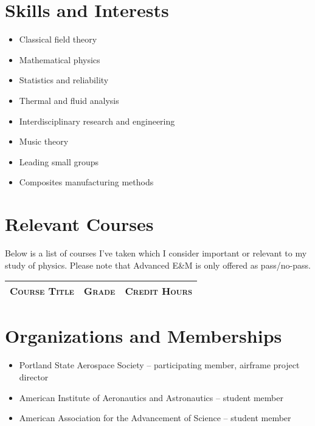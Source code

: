 \documentclass[letterpaper]{article}
\begin{document}
\section{Skills and Interests}
\begin{minipage}{\textwidth}
\begin{center}
\begin{multicols}{2}
\begin{itemize}
	\item Classical field theory
	\item Mathematical physics
	\item Statistics and reliability
	\item Thermal and fluid analysis
	\item Interdisciplinary research and engineering
	\item Music theory
	\item Leading small groups
	\item Composites manufacturing methods
\end{itemize}
\end{multicols}
\end{center}
\end{minipage}


\section{Relevant Courses}
\noindent Below is a list of courses I've taken which I consider important or relevant to my study of physics.
Please note that Advanced E\&M is only offered as pass/no-pass.
\begin{center}
\begin{tabular}{llr}
\textsc{Course Title}	&	\textsc{Grade}	&	\textsc{Credit Hours}	\\
	\hline

\end{tabular}
\end{center}


\section{Organizations and Memberships}
\begin{itemize}
	\item Portland State Aerospace Society -- participating member, airframe project director
	\item American Institute of Aeronautics and Astronautics -- student member
	\item American Association for the Advancement of Science -- student member
\end{itemize}
\end{document}
